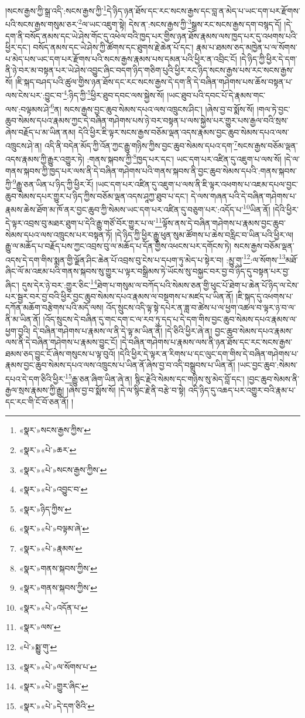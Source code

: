 །སངས་རྒྱས་ཀྱི་སྒྲ་འདི་:སངས་རྒྱས་ཀྱི་\footnote{«སྣར་»སངས་རྒྱས་ཀྱིས་}དེ་ཉིད་ཉན་ཐོས་དང་རང་སངས་རྒྱས་དང་བླ་ན་མེད་པ་ཡང་དག་པར་རྫོགས་པའི་སངས་རྒྱས་གསུམ་ཅར་\footnote{«སྣར་»«པེ་»ཆར་}ལ་ཡང་འཇུག་སྟེ། དེས་ན་:སངས་རྒྱས་ཀྱི་\footnote{«སྣར་»«པེ་»སངས་རྒྱས་ཀྱིས་}སྒྲས་རང་སངས་རྒྱས་དག་བསྙད་དོ། །དེ་དག་ནི་བསོད་ནམས་དང་ཡེ་ཤེས་གོང་དུ་འཕེལ་བའི་ཁྱད་པར་གྱིས་ཉན་ཐོས་རྣམས་ལས་ཁྱད་པར་དུ་འཕགས་པའི་ཕྱིར་དང་། བསོད་ནམས་དང་ཡེ་ཤེས་ཀྱི་ཚོགས་དང་ཐུགས་རྗེ་ཆེན་པོ་དང་། རྣམ་པ་ཐམས་ཅད་མཁྱེན་པ་ལ་སོགས་པ་མེད་པས་ཡང་དག་པར་རྫོགས་པའི་སངས་རྒྱས་རྣམས་པས་དམན་པའི་ཕྱིར་ན་འབྲིང་ངོ། །དེ་ཉིད་ཀྱི་ཕྱིར་དེ་དག་ནི་ཉེ་བར་མ་བསྟན་པར་ཡེ་ཤེས་འབྱུང་ཞིང་བདག་ཉིད་གཅིག་པུའི་ཕྱིར་རང་ཉིད་སངས་རྒྱས་པས་རང་སངས་རྒྱས་སོ། །ཇི་སྐད་བཤད་པའི་ཚུལ་གྱིས་ཉན་ཐོས་དང་རང་སངས་རྒྱས་དེ་དག་ནི་དེ་བཞིན་གཤེགས་པས་ཆོས་བསྟན་པ་ལས་ངེས་པར་:བྱུང་བ་\footnote{«སྣར་»«པེ་»འབྱུང་བ་}:ཉིད་ཀྱི་\footnote{«སྣར་»ཉིད་ཀྱིས་}ཕྱིར་ཐུབ་དབང་ལས་སྐྱེས་སོ། །ཡང་ཐུབ་པའི་དབང་པོ་དེ་རྣམས་གང་ལས་:བལྟམས་ཤེ་\footnote{«སྣར་»«པེ་»བལྟམ་ཞེ་}ན། སངས་རྒྱས་བྱང་ཆུབ་སེམས་དཔའ་ལས་འཁྲུངས་ཤིང་། །ཞེས་བྱ་བ་སྨོས་སོ། །གལ་ཏེ་བྱང་ཆུབ་སེམས་དཔའ་རྣམས་ཀྱང་དེ་བཞིན་གཤེགས་པས་ཉེ་བར་བསྟན་པ་ལས་སྐྱེས་པར་གྱུར་པས་རྒྱལ་བའི་སྲས་ཞེས་བརྗོད་པ་མ་ཡིན་ནམ། དེའི་ཕྱིར་ཇི་ལྟར་སངས་རྒྱས་བཅོམ་ལྡན་འདས་རྣམས་བྱང་ཆུབ་སེམས་དཔའ་ལས་འཁྲུངས་ཤེ་ན། འདི་ནི་བདེན་མོད་ཀྱི་འོན་ཀྱང་རྒྱུ་གཉིས་ཀྱིས་བྱང་ཆུབ་སེམས་དཔའ་དག་\footnote{«སྣར་»«པེ་»རྣམས་}སངས་རྒྱས་བཅོམ་ལྡན་འདས་རྣམས་ཀྱི་རྒྱུར་འགྱུར་ཏེ། :གནས་སྐབས་ཀྱི་\footnote{«སྣར་»གནས་སྐབས་ཀྱིས་}ཁྱད་པར་དང་། ཡང་དག་པར་འཛིན་དུ་འཇུག་པ་ལས་སོ། །དེ་ལ་གནས་སྐབས་ཀྱི་ཁྱད་པར་ལས་ནི་དེ་བཞིན་གཤེགས་པའི་གནས་སྐབས་ནི་བྱང་ཆུབ་སེམས་དཔའི་:གནས་སྐབས་ཀྱི་\footnote{«སྣར་»གནས་སྐབས་ཀྱིས་}རྒྱུ་ཅན་ཡིན་པ་ཉིད་ཀྱི་ཕྱིར་རོ། །ཡང་དག་པར་འཛིན་དུ་འཇུག་པ་ལས་ནི་ཇི་ལྟར་འཕགས་པ་འཇམ་དཔལ་བྱང་ཆུབ་སེམས་དཔར་གྱུར་པ་ཉིད་ཀྱིས་བཅོམ་ལྡན་འདས་ཤཱཀྱ་ཐུབ་པ་དང་། དེ་ལས་གཞན་པའི་དེ་བཞིན་གཤེགས་པ་རྣམས་ཆེས་ཐོག་མ་ཁོ་ནར་བྱང་ཆུབ་ཀྱི་སེམས་ཡང་དག་པར་འཛིན་དུ་བཅུག་པར་:འདོད་པ་\footnote{«སྣར་»«པེ་»འདོན་པ་}ཡིན་ནོ། །དེའི་ཕྱིར་དེ་ལྟར་འབྲས་བུ་མཐར་ཐུག་པ་དེའི་རྒྱུ་གཙོ་བོར་གྱུར་པ་ལ་\footnote{«སྣར་»ལས་}ལྟོས་ནས་དེ་བཞིན་གཤེགས་པ་རྣམས་བྱང་ཆུབ་སེམས་དཔའ་ལས་འཁྲུངས་པར་བསྟན་ཏོ། །དེ་ཉིད་ཀྱི་ཕྱིར་རྒྱུ་ཕུན་སུམ་ཚོགས་པ་ཆེས་བརླིང་བ་ཡིན་པའི་ཕྱིར་ལ། རྒྱུ་ལ་མཆོད་པ་བརྗོད་པས་ཀྱང་འབྲས་བུ་ལ་མཆོད་པ་དོན་གྱིས་འཕངས་པར་དགོངས་ཏེ། སངས་རྒྱས་བཅོམ་ལྡན་འདས་དེ་དག་གིས་སྨན་གྱི་ལྗོན་ཤིང་ཆེན་པོ་འབྲས་བུ་ངེས་པ་དཔག་ཏུ་མེད་པ་སྟེར་བ། :མྱུ་གུ་\footnote{«པེ་»སྨྱུ་གུ་}:ལ་སོགས་\footnote{«སྣར་»«པེ་»ལ་སོགས་པ་}མཐོ་ཞིང་ལོ་མ་འཇམ་པའི་གནས་སྐབས་སུ་གྱུར་པ་ལྟར་བསྒྲིམས་ཏེ་ཡོངས་སུ་བསྐྱང་བར་བྱ་བ་ཉིད་དུ་བསྟན་པར་བྱ་ཞིང་། དུས་དེར་ཉེ་བར་:གྱུར་ཅིང་\footnote{«སྣར་»«པེ་»གྱུར་ཞིང་}ཐེག་པ་གསུམ་ལ་བཀོད་པའི་སེམས་ཅན་གྱི་ཕུང་པོ་ཐེག་པ་ཆེན་པོ་ཉིད་ལ་ངེས་པར་སྦྱར་བར་བྱ་བའི་ཕྱིར་བྱང་ཆུབ་སེམས་དཔའ་རྣམས་ལ་བསྔགས་པ་མཛད་པ་ཡིན་ནོ། །ཇི་སྐད་དུ་འཕགས་པ་དཀོན་མཆོག་བརྩེགས་པའི་མདོ་ལས། འོད་སྲུངས་འདི་ལྟ་སྟེ་དཔེར་ན་ཟླ་བ་ཚེས་པ་ལ་ཕྱག་འཚལ་བ་ལྟར་ཉ་བ་ལ་ནི་མ་ཡིན་ནོ། །འོད་སྲུངས་དེ་བཞིན་དུ་གང་དག་ང་ལ་རབ་ཏུ་དད་པ་དེ་དག་གིས་བྱང་ཆུབ་སེམས་དཔའ་རྣམས་ལ་ཕྱག་བྱའི། དེ་བཞིན་གཤེགས་པ་རྣམས་ལ་ནི་དེ་ལྟ་མ་ཡིན་ནོ། །དེ་ཅིའི་ཕྱིར་ཞེ་ན། བྱང་ཆུབ་སེམས་དཔའ་རྣམས་ལས་ནི་དེ་བཞིན་གཤེགས་པ་རྣམས་བྱུང་ངོ། །དེ་བཞིན་གཤེགས་པ་རྣམས་ལས་ནི་ཉན་ཐོས་དང་རང་སངས་རྒྱས་ཐམས་ཅད་བྱུང་ངོ་ཞེས་གསུངས་པ་ལྟ་བུའོ། །དེའི་ཕྱིར་དེ་ལྟར་ན་རིགས་པ་དང་ལུང་དག་གིས་དེ་བཞིན་གཤེགས་པ་རྣམས་བྱང་ཆུབ་སེམས་དཔའ་ལས་འཁྲུངས་པ་ཡིན་ནོ་ཞེས་བྱ་བ་འདི་བསྒྲུབས་པ་ཡིན་ནོ། །ཡང་བྱང་ཆུབ་:སེམས་དཔའ་དེ་དག་ཅིའི་ཕྱིར་\footnote{«སྣར་»«པེ་»དེ་དག་ཅིའི་}རྒྱུ་ཅན་ཞིག་ཡིན་ཞེ་ན། སྙིང་རྗེའི་སེམས་དང་གཉིས་སུ་མེད་བློ་དང་། །བྱང་ཆུབ་སེམས་ནི་རྒྱལ་སྲས་རྣམས་ཀྱི་རྒྱུ། །ཞེས་བྱ་བ་སྨོས་སོ། །དེ་ལ་སྙིང་རྗེ་ནི་བརྩེ་བ་སྟེ། འདི་ཉིད་དུ་འཆད་པར་འགྱུར་བའི་རྣམ་པ་དང་རང་གི་ངོ་བོ་ཅན་ནོ། །

